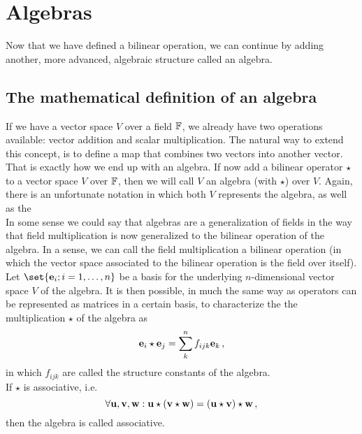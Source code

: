 \section{Algebras}
    Now that we have defined a bilinear operation, we can continue by adding another, more advanced, algebraic structure called an algebra.

    \subsection{The mathematical definition of an algebra}
        If we have a vector space $V$ over a field $\mathbb{F}$, we already have two operations available: vector addition and scalar multiplication. The natural way to extend this concept, is to define a map that combines two vectors into another vector. That is exactly how we end up with an algebra. If now add a bilinear operator $\star$ to a vector space $V$ over $\mathbb{F}$, then we will call $V$ an algebra (with $\star$) over $V$. Again, there is an unfortunate notation in which both $V$ represents the algebra, as well as the \\

        In some sense we could say that algebras are a generalization of fields in the way that field multiplication is now generalized to the bilinear operation of the algebra. In a sense, we can call the field multiplication a bilinear operation (in which the vector space associated to the bilinear operation is the field over itself). \\

        Let $\set{\vb{e}_i ; i=1,\dots,n}$ be a basis for the underlying $n$-dimensional vector space $V$ of the algebra. It is then possible, in much the same way as operators can be represented as matrices in a certain basis, to characterize the the multiplication $\star$ of the algebra as
        \begin{equation}
            \vb{e}_i \star \vb{e}_j = \sum_k^n f_{ijk} \vb{e}_k \thinspace ,
        \end{equation}
        in which $f_{ijk}$ are called the structure constants of the algebra. \\

        If $\star$ is associative, i.e.
        \begin{equation}
            \forall \vb{u}, \vb{v}, \vb{w}: \vb{u} \star (\vb{v} \star \vb{w}) = (\vb{u} \star \vb{v}) \star \vb{w} \thinspace ,
        \end{equation}
        then the algebra is called associative.

